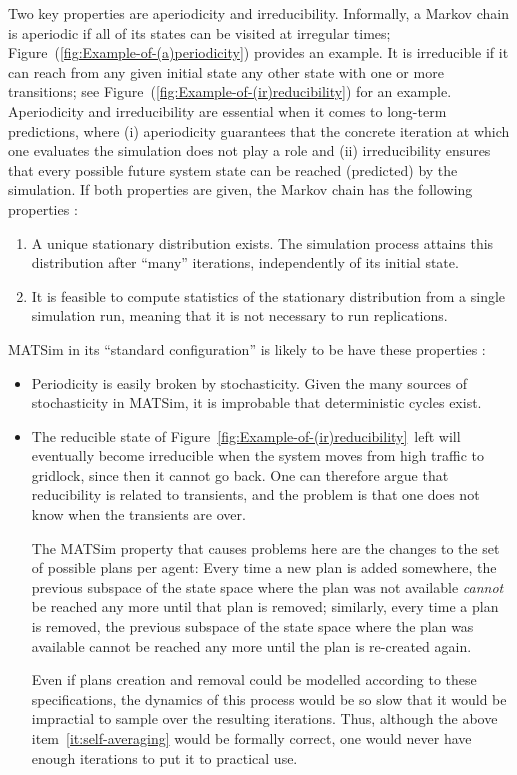 Two key properties are aperiodicity and irreducibility. Informally,
a Markov chain is aperiodic if all of its states can be visited at
irregular times; Figure~(\ref{fig:Example-of-(a)periodicity}) provides
an example. It is irreducible if it can reach from any given initial
state any other state with one or more transitions; see Figure~(\ref{fig:Example-of-(ir)reducibility})
for an example. Aperiodicity and irreducibility are essential when
it comes to long-term predictions, where (i) aperiodicity guarantees
that the concrete iteration at which one evaluates the simulation
does not play a role and (ii) irreducibility ensures that every possible
future system state can be reached (predicted) by the simulation.
If both properties are given, the Markov chain has the following properties
\citep{ross-2006}:
\begin{enumerate}
\item A unique stationary distribution exists. The simulation process attains
this distribution after {}``many'' iterations, independently of
its initial state.
\item It is feasible to compute statistics of the stationary distribution
from a single simulation run, meaning that it is not necessary to
run replications.
\label{it:self-averaging}
\end{enumerate}
MATSim in its {}``standard configuration'' is likely to be have
these properties :
\begin{itemize}

\item Periodicity is easily broken by stochasticity.  Given the many sources of stochasticity in MATSim, it is improbable that deterministic cycles exist.

\item The reducible state of Figure~\ref{fig:Example-of-(ir)reducibility}~left will eventually become irreducible when the system moves from high traffic to gridlock, since then it cannot go back.  One can therefore argue that reducibility is related to transients, and the problem is that one does not know when the transients are over. 

The MATSim property that causes problems here are the changes to the set of possible plans per agent: Every time a new plan is added somewhere, the previous subspace of the state space where the plan was not available \emph{cannot} be reached any more until that plan is removed; similarly, every time a plan is removed, the previous subspace of the state space where the plan was available cannot be reached any more until the plan is re-created again.  

Even if plans creation and removal could be modelled according to these specifications, the dynamics of this process would be so slow that it would be impractial to sample over the resulting iterations.  Thus, although the above item~\ref{it:self-averaging} would be formally correct, one would never have enough iterations to put it to practical use.

\end{itemize}
